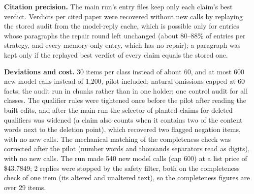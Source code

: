 \documentclass{article} %
\begin{document}
\textbf{Citation precision.} The main run's entry files keep only each claim's best verdict. Verdicts per cited paper were recovered without new calls by replaying the stored audit from the model-reply cache, which is possible only for entries whose paragraphs the repair round left unchanged (about 80--88\% of entries per strategy, and every memory-only entry, which has no repair); a paragraph was kept only if the replayed best verdict of every claim equals the stored one.

\textbf{Deviations and cost.} 30 items per class instead of about 60, and at most 600 new model calls instead of 1,200, pilot included; natural omissions capped at 60 facts; the audit run in chunks rather than in one holder; one control audit for all classes. The qualifier rules were tightened once before the pilot after reading the built edits, and after the main run the selector of planted claims for deleted qualifiers was widened (a claim also counts when it contains two of the content words next to the deletion point), which recovered two flagged negation items, with no new calls. The mechanical matching of the completeness check was corrected after the pilot (number words and thousands separators read as digits), with no new calls. The run made 540 new model calls (cap 600) at a list price of \$43.7849; 2 replies were stopped by the safety filter, both on the completeness check of one item (its altered and unaltered text), so the completeness figures are over 29 items.
\end{document}
